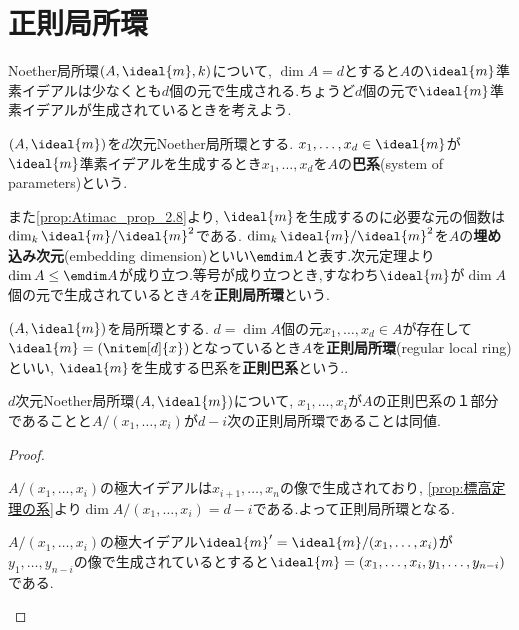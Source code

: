 \section{正則局所環}

Noether局所環$(A,\ideal{m},k)$について, $\dim A=d$とすると$A$の$\ideal{m}$準素イデアルは少なくとも$d$個の元で生成される.ちょうど$d$個の元で$\ideal{m}$準素イデアルが生成されているときを考えよう.
\begin{defi}[巴系]
	$(A,\ideal{m})$を$d$次元Noether局所環とする. $x_1,\dots,x_d\in\ideal{m}$が$\ideal{m}$準素イデアルを生成するとき$x_1,\dots,x_d$を$A$の\textbf{巴系}(system of parameters)という.
\end{defi}

また\ref{prop:Atimac_prop_2.8}より, $\ideal{m}$を生成するのに必要な元の個数は$\dim_k\ideal{m}/\ideal{m}^2$である. $\dim_k\ideal{m}/\ideal{m}^2$を$A$の\textbf{埋め込み次元}(embedding dimension)といい$\emdim A$と表す.次元定理より$\dim A\leq\emdim A$が成り立つ.等号が成り立つとき,すなわち$\ideal{m}$が$\dim A$個の元で生成されているとき$A$を\textbf{正則局所環}という.

\begin{defi}[正則局所環]
	$(A,\ideal{m})$を局所環とする. $d=\dim A$個の元$x_1,\dots,x_d\in A$が存在して$\ideal{m}=(\nitem[d]{x})$となっているとき$A$を\textbf{正則局所環}(regular local ring)といい, $\ideal{m}$を生成する巴系を\textbf{正則巴系}という..
\end{defi}

\begin{prop}
$d$次元Noether局所環$(A,\ideal{m})$について, $x_1,\dots,x_i$が$A$の正則巴系の１部分であることと$A/(x_1,\dots,x_i)$が$d-i$次の正則局所環であることは同値.
\end{prop}

\begin{proof}
	\begin{eqv}
		\item $A/(x_1,\dots,x_i)$の極大イデアルは$x_{i+1},\dots,x_n$の像で生成されており, \ref{prop:標高定理の系}より$\dim A/(x_1,\dots,x_i)=d-i$である.よって正則局所環となる.
		
		\item $A/(x_1,\dots,x_i)$の極大イデアル$\ideal{m}'=\ideal{m}/(x_1,\dots,x_i)$が$y_1,\dots,y_{n-i}$の像で生成されているとすると$\ideal{m}=(x_1,\dots,x_i,y_1,\dots,y_{n-i})$である.
	\end{eqv}
\end{proof}


